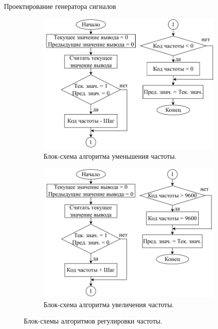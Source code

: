 \documentclass[10pt]{beamer}
\begin{document}
\begin{frame}{Проектирование генератора сигналов}
\begin{figure}
     \begin{subfigure}[H]{0.495\textwidth}
         \centering
         \includegraphics[width=1\textwidth]{minus_freq}
         \caption{Блок-схема алгоритма уменьшения частоты.}
     \end{subfigure}
     \hfill
     \begin{subfigure}[H]{0.495\textwidth}
         \centering
         \includegraphics[width=1\textwidth]{plus_freq}
         \caption{Блок-схема алгоритма увеличения частоты.}
     \end{subfigure}
        \caption{Блок-схемы алгоритмов регулировки частоты.}
\end{figure}
\end{frame}
\end{document}
